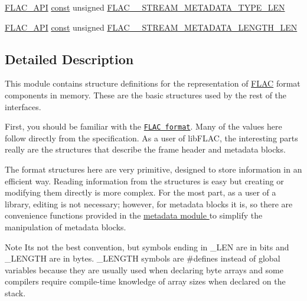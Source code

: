 \begin{DoxyCompactItemize}
\item 
\hyperlink{group__flac__export_ga56ca07df8a23310707732b1c0007d6f5}{F\+L\+A\+C\+\_\+\+A\+PI} \hyperlink{getopt1_8c_a2c212835823e3c54a8ab6d95c652660e}{const} unsigned \hyperlink{group__flac__format_ga3804c687f8aef9c26369a63dd0a6b55c}{F\+L\+A\+C\+\_\+\+\_\+\+S\+T\+R\+E\+A\+M\+\_\+\+M\+E\+T\+A\+D\+A\+T\+A\+\_\+\+T\+Y\+P\+E\+\_\+\+L\+EN}
\item 
\hyperlink{group__flac__export_ga56ca07df8a23310707732b1c0007d6f5}{F\+L\+A\+C\+\_\+\+A\+PI} \hyperlink{getopt1_8c_a2c212835823e3c54a8ab6d95c652660e}{const} unsigned \hyperlink{group__flac__format_ga4e565861db32c57c2f6bc71e9f1207a9}{F\+L\+A\+C\+\_\+\+\_\+\+S\+T\+R\+E\+A\+M\+\_\+\+M\+E\+T\+A\+D\+A\+T\+A\+\_\+\+L\+E\+N\+G\+T\+H\+\_\+\+L\+EN}
\end{DoxyCompactItemize}


\subsection{Detailed Description}
This module contains structure definitions for the representation of \hyperlink{namespace_f_l_a_c}{F\+L\+AC} format components in memory. These are the basic structures used by the rest of the interfaces. 

First, you should be familiar with the \href{../format.html}{\tt F\+L\+AC format}. Many of the values here follow directly from the specification. As a user of lib\+F\+L\+AC, the interesting parts really are the structures that describe the frame header and metadata blocks.

The format structures here are very primitive, designed to store information in an efficient way. Reading information from the structures is easy but creating or modifying them directly is more complex. For the most part, as a user of a library, editing is not necessary; however, for metadata blocks it is, so there are convenience functions provided in the \hyperlink{group__flac__metadata}{metadata module } to simplify the manipulation of metadata blocks.

\begin{DoxyNote}{Note}
It\textquotesingle{}s not the best convention, but symbols ending in \+\_\+\+L\+EN are in bits and \+\_\+\+L\+E\+N\+G\+TH are in bytes. \+\_\+\+L\+E\+N\+G\+TH symbols are \#defines instead of global variables because they are usually used when declaring byte arrays and some compilers require compile-\/time knowledge of array sizes when declared on the stack. 
\end{DoxyNote}


